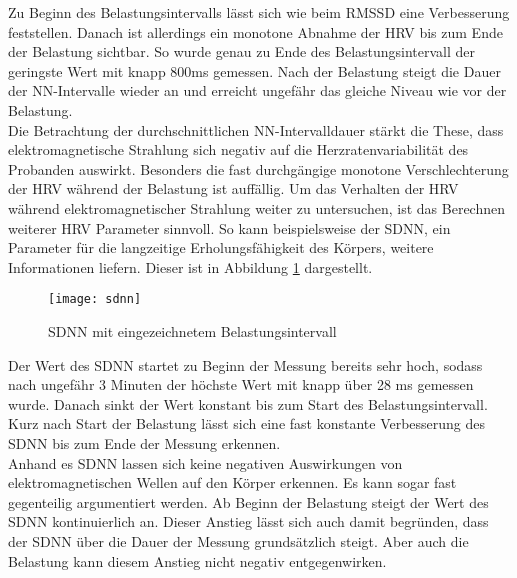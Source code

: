 Zu Beginn des Belastungsintervalls lässt sich wie beim RMSSD eine Verbesserung feststellen. Danach ist allerdings ein monotone Abnahme der HRV bis zum Ende der Belastung sichtbar. So wurde genau zu Ende des Belastungsintervall der geringste Wert mit knapp 800ms gemessen. Nach der Belastung steigt die Dauer der NN-Intervalle wieder an und erreicht ungefähr das gleiche Niveau wie vor der Belastung. \\
Die Betrachtung der durchschnittlichen NN-Intervalldauer stärkt die These, dass elektromagnetische Strahlung sich negativ auf die Herzratenvariabilität des Probanden auswirkt. Besonders die fast durchgängige monotone Verschlechterung der HRV während der Belastung ist auffällig. Um das Verhalten der HRV während elektromagnetischer Strahlung weiter zu untersuchen, ist das Berechnen weiterer HRV Parameter sinnvoll. So kann beispielsweise der SDNN, ein Parameter für die langzeitige Erholungsfähigkeit des Körpers, weitere Informationen liefern. Dieser ist in Abbildung \ref{fig:sdnn} dargestellt.
\begin{figure}[H]
	\centering
	\texttt{[image: sdnn]}
	\caption{SDNN mit eingezeichnetem Belastungsintervall}
	\label{fig:sdnn}
\end{figure}

Der Wert des SDNN startet zu Beginn der Messung bereits sehr hoch, sodass nach ungefähr 3 Minuten der höchste Wert mit knapp über 28 ms gemessen wurde. Danach sinkt der Wert konstant bis zum Start des Belastungsintervall. Kurz nach Start der Belastung lässt sich eine fast konstante Verbesserung des SDNN bis zum Ende der Messung erkennen. \\
Anhand es SDNN lassen sich keine negativen Auswirkungen von elektromagnetischen Wellen auf den Körper erkennen. Es kann sogar fast gegenteilig argumentiert werden. Ab Beginn der Belastung steigt der Wert des SDNN kontinuierlich an. Dieser Anstieg lässt sich auch damit begründen, dass der SDNN über die Dauer der Messung grundsätzlich steigt. Aber auch die Belastung kann diesem Anstieg nicht negativ entgegenwirken.  

